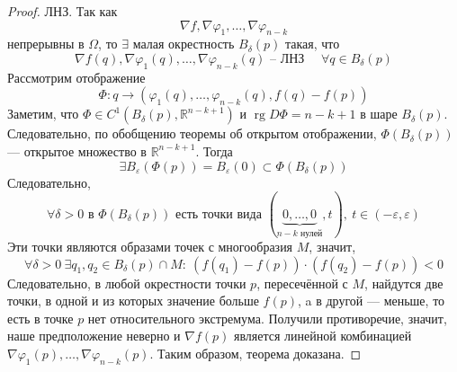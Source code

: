 \documentclass[11pt]{article}
\DeclareMathOperator{\rg}{rg}
\begin{document}
\begin{proof}
    ЛНЗ. Так как \[\nabla f, \nabla \varphi_1, \dots, \nabla \varphi_{n-k}\] непрерывны в 
    $\Omega$, то $\exists$ малая окрестность $B_\delta(p)$ такая, что 
    \[\nabla f(q), \nabla \varphi_1(q), \dots, \nabla \varphi_{n-k}(q) \text{ -- ЛНЗ }
    \quad \forall q \in B_\delta(p)\]
    Рассмотрим отображение \[\Phi: q \to \left(\varphi_1(q), \dots, \varphi_{n-k}(q), f(q)-f(p)\right)\]
    Заметим, что $\Phi \in C^1(B_\delta(p), \mathbb{R}^{n-k+1})$ и $\rg D\Phi = n-k+1$
    в шаре $B_\delta(p)$. Следовательно, по обобщению теоремы об открытом отображении, 
    $\Phi(B_\delta(p))$ --- открытое множество в $\mathbb{R}^{n-k+1}$. Тогда 
    \[ \exists B_\varepsilon(\Phi(p)) = B_\varepsilon(0) \subset \Phi(B_\delta(p))\]
    Следовательно, \[\forall \delta > 0 \text{ в } \Phi(B_\delta(p)) \text{ есть точки вида }
    (\underbrace{0, \dots, 0}_{n - k \text{ нулей}}, t), \ t \in (-\varepsilon, \varepsilon)\]
    Эти точки являются образами точек с многообразия $M$, значит, 
    \[ \forall \delta > 0 \ \exists q_1, q_2 \in B_\delta(p) \cap M: \ (f(q_1) -
    f(p)) \cdot (f(q_2) - f(p)) < 0 \]
    Следовательно, в любой окрестности точки $p$, пересечённой с $M$, найдутся две точки, в одной и из которых значение больше $f(p)$, a в другой --- меньше,
    то есть в точке $p$ нет относительного экстремума. Получили противоречие, значит, наше предположение неверно
    и $\nabla f (p)$ является линейной комбинацией $\nabla \varphi_1(p), 
    \dots, \nabla \varphi_{n-k}(p)$. Таким образом, теорема доказана.
\end{proof}
\end{document}
